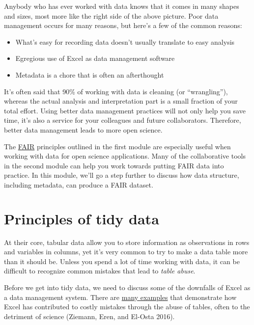 \documentclass[
  letterpaper,
  DIV=11,
  numbers=noendperiod]{scrreprt}
\providecommand{\tightlist}{%
  \setlength{\itemsep}{0pt}\setlength{\parskip}{0pt}}\usepackage{longtable,booktabs,array}
\begin{document}
Anybody who has ever worked with data knows that it comes in many shapes
and sizes, most more like the right side of the above picture. Poor data
management occurs for many reasons, but here's a few of the common
reasons:

\begin{itemize}
\tightlist
\item
  What's easy for recording data doesn't usually translate to easy
  analysis
\item
  Egregious use of Excel as data management software
\item
  Metadata is a chore that is often an afterthought
\end{itemize}

It's often said that 90\% of working with data is cleaning (or
``wrangling''), whereas the actual analysis and interpretation part is a
small fraction of your total effort. Using better data management
practices will not only help you save time, it's also a service for your
colleagues and future collaborators. Therefore, better data management
leads to more open science.

The \protect\hyperlink{fair}{FAIR} principles outlined in the first
module are especially useful when working with data for open science
applications. Many of the collaborative tools in the second module can
help you work towards putting FAIR data into practice. In this module,
we'll go a step further to discuss how data structure, including
metadata, can produce a FAIR dataset.

\hypertarget{tidy}{%
\section{Principles of tidy data}\label{tidy}}

At their core, tabular data allow you to store information as
observations in rows and variables in columns, yet it's very common to
try to make a data table more than it should be. Unless you spend a lot
of time working with data, it can be difficult to recognize common
mistakes that lead to \emph{table abuse}.

Before we get into tidy data, we need to discuss some of the downfalls
of Excel as a data management system. There are
\href{http://www.eusprig.org/horror-stories.htm}{many examples} that
demonstrate how Excel has contributed to costly mistakes through the
abuse of tables, often to the detriment of science (Ziemann, Eren, and
El-Osta 2016).
\end{document}
